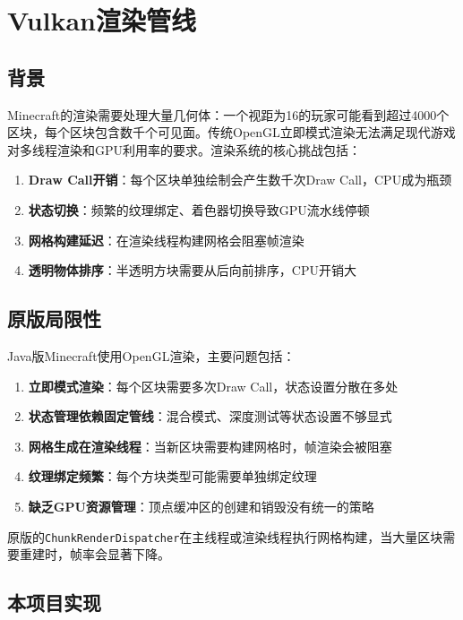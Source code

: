 \section{Vulkan渲染管线}
\label{sec:vulkan}

\subsection{背景}

Minecraft的渲染需要处理大量几何体：一个视距为16的玩家可能看到超过4000个区块，每个区块包含数千个可见面。传统OpenGL立即模式渲染无法满足现代游戏对多线程渲染和GPU利用率的要求。渲染系统的核心挑战包括：

\begin{enumerate}
    \item \textbf{Draw Call开销}：每个区块单独绘制会产生数千次Draw Call，CPU成为瓶颈
    \item \textbf{状态切换}：频繁的纹理绑定、着色器切换导致GPU流水线停顿
    \item \textbf{网格构建延迟}：在渲染线程构建网格会阻塞帧渲染
    \item \textbf{透明物体排序}：半透明方块需要从后向前排序，CPU开销大
\end{enumerate}

\subsection{原版局限性}

Java版Minecraft使用OpenGL渲染，主要问题包括：

\begin{enumerate}
    \item \textbf{立即模式渲染}：每个区块需要多次Draw Call，状态设置分散在多处
    \item \textbf{状态管理依赖固定管线}：混合模式、深度测试等状态设置不够显式
    \item \textbf{网格生成在渲染线程}：当新区块需要构建网格时，帧渲染会被阻塞
    \item \textbf{纹理绑定频繁}：每个方块类型可能需要单独绑定纹理
    \item \textbf{缺乏GPU资源管理}：顶点缓冲区的创建和销毁没有统一的策略
\end{enumerate}

原版的\texttt{ChunkRenderDispatcher}在主线程或渲染线程执行网格构建，当大量区块需要重建时，帧率会显著下降。

\subsection{本项目实现}

